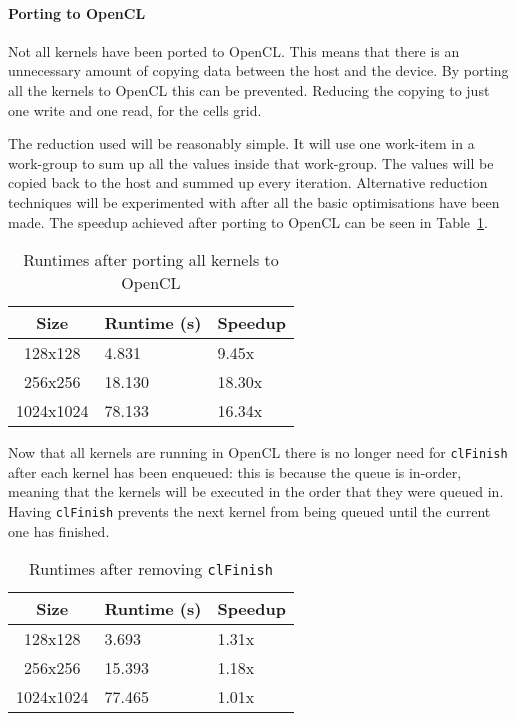 


\paragraph{Porting to OpenCL}
Not all kernels have been ported to OpenCL. This means that there is an unnecessary amount of copying data between the host and the device. By porting all the kernels to OpenCL this can be prevented. Reducing the copying to just one write and one read, for the cells grid. 


The reduction used will be reasonably simple. It will use one work-item in a work-group to sum up all the values inside that work-group. The values will be copied back to the host and summed up every iteration. Alternative reduction techniques will be experimented with after all the basic optimisations have been made. The speedup achieved after porting to OpenCL can be seen in Table~\ref{table:porting-to-opencl}. 

\begin{table}[ht]
\vspace{-5mm}
\centering
\caption{Runtimes after porting all kernels to OpenCL}
\vspace{1mm}
\begin{tabular}{|c||p{5.8em}|p{4.8em}|}
    \hline
    Size & Runtime (s) & Speedup \\
    \hline
    128x128 & 4.831 & 9.45x \\
    \hline
    256x256 & 18.130 & 18.30x \\
    \hline
    1024x1024 & 78.133 & 16.34x \\
    \hline
\end{tabular}
\label{table:porting-to-opencl}
\vspace{-3mm}
\end{table}

Now that all kernels are running in OpenCL there is no longer need for \texttt{clFinish} after each kernel has been enqueued: this is because the queue is in-order, meaning that the kernels will be executed in the order that they were queued in. Having \texttt{clFinish} prevents the next kernel from being queued until the current one has finished.

\begin{table}[ht]
\vspace{-5mm}
\centering
\caption{Runtimes after removing \texttt{clFinish}}
\vspace{1mm}
\begin{tabular}{|c||p{5.8em}|p{4.8em}|}
    \hline
    Size & Runtime (s) & Speedup \\
    \hline
    128x128 & 3.693 & 1.31x \\
    \hline
    256x256 & 15.393 & 1.18x \\
    \hline
    1024x1024 & 77.465 & 1.01x \\
    \hline
\end{tabular}
\label{table:removing-clfinish}
\vspace{-7mm}
\end{table}